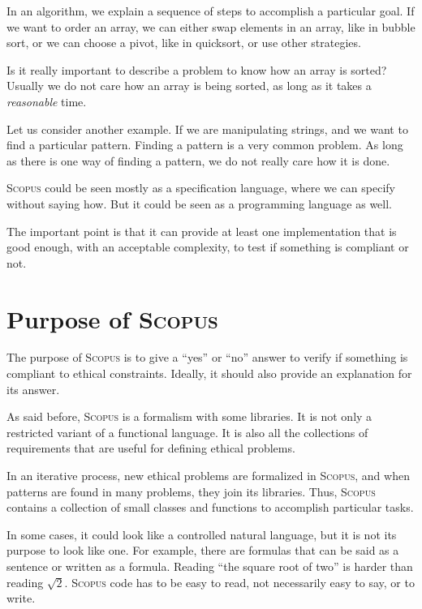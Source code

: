 \documentclass[12pt,a4paper]{book}
\newcommand{\Scopus}{\textsc{Scopus}\xspace}
\begin{document}
    In an algorithm, we explain a sequence of steps to accomplish a particular goal.
    If we want to order an array, we can either swap elements in an array, like in bubble sort, or we can choose a pivot, like in quicksort, or use other strategies.

    Is it really important to describe a problem to know how an array is sorted?
    Usually we do not care how an array is being sorted, as long as it takes a \textit{reasonable} time.

    Let us consider another example.
    If we are manipulating strings, and we want to find a particular pattern.
    Finding a pattern is a very common problem.
    As long as there is one way of finding a pattern, we do not really care how it is done.

    \Scopus could be seen mostly as a specification language, where we can specify without saying how.
    But it could be seen as a programming language as well.

    The important point is that it can provide at least one implementation that is good enough, with an acceptable complexity, to test if something is compliant or not.


    \section{Purpose of \Scopus}

    The purpose of \Scopus is to give a ``yes'' or ``no'' answer to verify if something is compliant to ethical constraints.
    Ideally, it should also provide an explanation for its answer.

    As said before, \Scopus is a formalism with some libraries.
    It is not only a restricted variant of a functional language.
    It is also all the collections of requirements that are useful for defining ethical problems.

    In an iterative process, new ethical problems are formalized in \Scopus, and when patterns are found in many problems, they join its libraries.
    Thus, \Scopus contains a collection of small classes and functions to accomplish particular tasks.

    In some cases, it could look like a controlled natural language, but it is not its purpose to look like one.
    For example, there are formulas that can be said as a sentence or written as a formula.
    Reading ``the square root of two'' is harder than reading $\sqrt{2}$.
    \Scopus code has to be easy to read, not necessarily easy to say, or to write.
\end{document}
